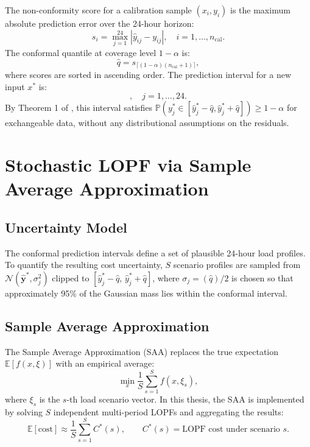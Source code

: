 The non-conformity score for a calibration sample $(x_i, y_i)$ is the maximum absolute prediction error over the 24-hour horizon:
\begin{equation}
    s_i = \max_{j=1}^{24} |\hat{y}_{ij} - y_{ij}|, \quad i = 1, \ldots, n_\text{cal}.
    \label{eq:nonconf_score}
\end{equation}
The conformal quantile at coverage level $1-\alpha$ is:
\begin{equation}
    \hat{q} = s_{\lceil (1-\alpha)(n_\text{cal}+1) \rceil},
    \label{eq:conf_quantile}
\end{equation}
where scores are sorted in ascending order. The prediction interval for a new input $x^*$ is:
\begin{equation}
    [\hat{y}_j^* - \hat{q},\; \hat{y}_j^* + \hat{q}], \quad j = 1,\ldots,24.
    \label{eq:conf_interval}
\end{equation}
By Theorem 1 of \cite{angelopoulos2022conformal}, this interval satisfies $\mathbb{P}(y_j^* \in [\hat{y}_j^* - \hat{q}, \hat{y}_j^* + \hat{q}]) \geq 1 - \alpha$ for exchangeable data, without any distributional assumptions on the residuals.

\section{Stochastic LOPF via Sample Average Approximation}
\label{sec:saa_math}

\subsection{Uncertainty Model}

The conformal prediction intervals define a set of plausible 24-hour load profiles. To quantify the resulting cost uncertainty, $S$ scenario profiles are sampled from $\mathcal{N}(\hat{\mathbf{y}}^*, \sigma_j^2)$ clipped to $[\hat{y}_j^* - \hat{q},\, \hat{y}_j^* + \hat{q}]$, where $\sigma_j = (\hat{q})/2$ is chosen so that approximately 95\% of the Gaussian mass lies within the conformal interval.

\subsection{Sample Average Approximation}

The Sample Average Approximation (SAA) \cite{shapiro2021saa} replaces the true expectation $\mathbb{E}[f(x, \xi)]$ with an empirical average:
\begin{equation}
    \min_{x} \frac{1}{S} \sum_{s=1}^{S} f(x, \xi_s),
\end{equation}
where $\xi_s$ is the $s$-th load scenario vector. In this thesis, the SAA is implemented by solving $S$ independent multi-period LOPFs and aggregating the results:
\begin{equation}
    \mathbb{E}[\text{cost}] \approx \frac{1}{S} \sum_{s=1}^{S} C^*(s), \qquad
    C^*(s) = \text{LOPF cost under scenario } s.
    \label{eq:saa_cost}
\end{equation}

